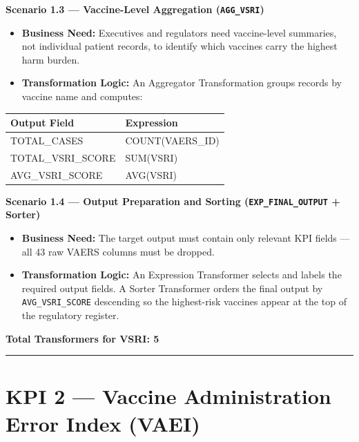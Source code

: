 \documentclass[12pt,a4paper]{report}
\begin{document}
\bigskip

\noindent\textbf{Scenario 1.3 — Vaccine-Level Aggregation (\texttt{AGG\_VSRI})}

\begin{itemize}[leftmargin=*]
  \item \textbf{Business Need:} Executives and regulators need vaccine-level summaries, not individual patient records, to identify which vaccines carry the highest harm burden.
  \item \textbf{Transformation Logic:} An Aggregator Transformation groups records by vaccine name and computes:
\end{itemize}

\begin{center}
\begin{tabular}{ll}
\toprule
\textbf{Output Field}     & \textbf{Expression} \\
\midrule
TOTAL\_CASES        & COUNT(VAERS\_ID)   \\
TOTAL\_VSRI\_SCORE  & SUM(VSRI)          \\
AVG\_VSRI\_SCORE    & AVG(VSRI)          \\
\bottomrule
\end{tabular}
\end{center}

\bigskip

\noindent\textbf{Scenario 1.4 — Output Preparation and Sorting (\texttt{EXP\_FINAL\_OUTPUT} + Sorter)}

\begin{itemize}[leftmargin=*]
  \item \textbf{Business Need:} The target output must contain only relevant KPI fields — all 43 raw VAERS columns must be dropped.
  \item \textbf{Transformation Logic:} An Expression Transformer selects and labels the required output fields. A Sorter Transformer orders the final output by \texttt{AVG\_VSRI\_SCORE} descending so the highest-risk vaccines appear at the top of the regulatory register.
\end{itemize}

\textbf{Total Transformers for VSRI: 5}

\vspace{10pt}
\noindent\rule{\textwidth}{0.4pt}

\section*{KPI 2 — Vaccine Administration Error Index (VAEI)}
\end{document}
